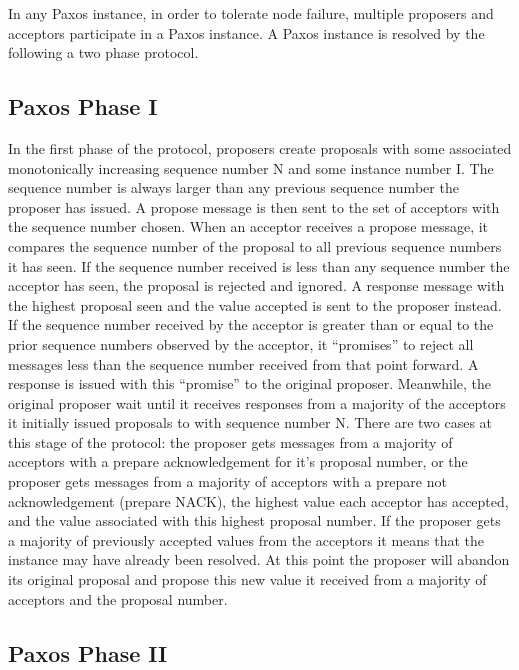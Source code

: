 \documentclass{article}
\begin{document}
In any Paxos instance, in order to tolerate node failure, multiple proposers and acceptors participate in a Paxos instance.
A Paxos instance is resolved by the following a two phase protocol.

\subsection{Paxos Phase I}

In the first phase of the protocol, proposers create proposals with some associated monotonically increasing sequence number N and some instance number I. 
The sequence number is always larger than any previous sequence number the proposer has issued. 
A propose message is then sent to the set of acceptors with the sequence number chosen. 
When an acceptor receives a propose message, it compares the sequence number of the proposal to all previous sequence numbers it has seen.
If the sequence number received is less than any sequence number the acceptor has seen, the proposal is rejected and ignored.
A response message with the highest proposal seen and the value accepted is sent to the proposer instead.
If the sequence number received by the acceptor is greater than or equal to the prior sequence numbers observed by the acceptor, it ``promises'' to reject all messages less than the sequence number received from that point forward.
A response is issued with this ``promise'' to the original proposer.
Meanwhile, the original proposer wait until it receives responses from a majority of the acceptors it initially issued proposals to with sequence number N.
There are two cases at this stage of the protocol: the proposer gets messages from a majority of acceptors with a prepare acknowledgement for it's proposal number, 
or the proposer gets messages from a majority of acceptors with a prepare not acknowledgement (prepare NACK), the highest value each acceptor has accepted, and the value associated with this highest proposal number.
If the proposer gets a majority of previously accepted values from the acceptors it means that the instance may have already been resolved.
At this point the proposer will abandon its original proposal and propose this new value it received from a majority of acceptors and the proposal number.

\subsection{Paxos Phase II}
\end{document}
